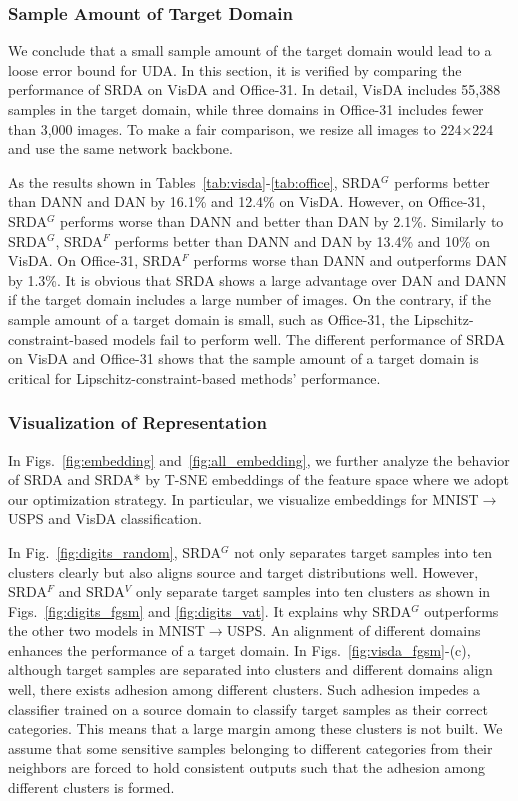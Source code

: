 \documentclass[journal,twocolumn]{IEEEtran}
\theoremstyle{definition}
\begin{document}
\subsubsection{Sample Amount of Target Domain}
We conclude that a small sample amount of the target domain would lead to a loose error bound for UDA. In this section, it is verified by comparing the performance of SRDA on VisDA and Office-31. In detail, VisDA includes 55,388 samples in the target domain,  while three domains in Office-31 includes fewer than 3,000 images. To make a fair comparison, we resize all images to 224$\times$224 and use the same network backbone. 

As the results shown in Tables~\ref{tab:visda}-\ref{tab:office}, SRDA$^G$ performs better than DANN and DAN by 16.1\% and 12.4\% on VisDA. However, on Office-31, SRDA$^G$ performs worse than DANN and better than DAN by 2.1\%. Similarly to SRDA$^G$, SRDA$^F$ performs better than DANN and DAN by 13.4\% and 10\% on VisDA. On Office-31, SRDA$^F$ performs worse than DANN and outperforms DAN by 1.3\%. It is obvious that SRDA shows a large advantage over DAN and DANN if the target domain includes a large number of images. On the contrary, if the sample amount of a target domain is small, such as Office-31, the Lipschitz-constraint-based models fail to perform well. The different performance of SRDA on VisDA and Office-31 shows that the sample amount of a target domain is critical for Lipschitz-constraint-based methods' performance.

\subsubsection{Visualization of Representation}

In Figs.~\ref{fig:embedding} and~\ref{fig:all_embedding}, we further analyze the behavior of SRDA and SRDA* by T-SNE embeddings of the feature space where we adopt our optimization strategy. In particular, we visualize embeddings for MNIST$\rightarrow$USPS and VisDA classification. 

In Fig.~\ref{fig:digits_random}, SRDA$^G$ not only separates target samples into ten clusters clearly but also aligns source and target distributions well. However, SRDA$^F$ and SRDA$^V$ only separate target samples into ten clusters as shown in Figs.~\ref{fig:digits_fgsm} and \ref{fig:digits_vat}. It explains why SRDA$^G$ outperforms the other two models in MNIST$\rightarrow$USPS. An alignment of different domains enhances the performance of a target domain. In Figs.~\ref{fig:visda_fgsm}-(c), although target samples are separated into clusters and different domains align well, there exists adhesion among different clusters. Such adhesion impedes a classifier trained on a source domain to classify target samples as their correct categories. This means that a large margin among these clusters is not built. We assume that some sensitive samples belonging to different categories from their neighbors are forced to hold consistent outputs such that the adhesion among different clusters is formed.
\end{document}
